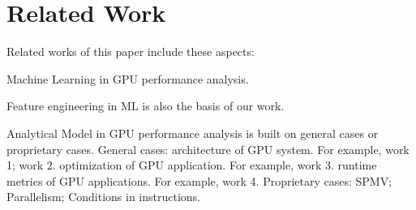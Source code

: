 \section{Related Work}

Related works of this paper include these aspects:


Machine Learning in GPU performance analysis. 

Feature engineering in ML is also the basis of our work.


Analytical Model in GPU performance analysis is built on general cases or proprietary cases.
General cases:
architecture of GPU system. For example, work 1; work 2.
optimization of GPU application. For example, work 3.
runtime metrics of GPU applications. For example, work 4.
Proprietary cases:
SPMV; Parallelism; Conditions in instructions.

